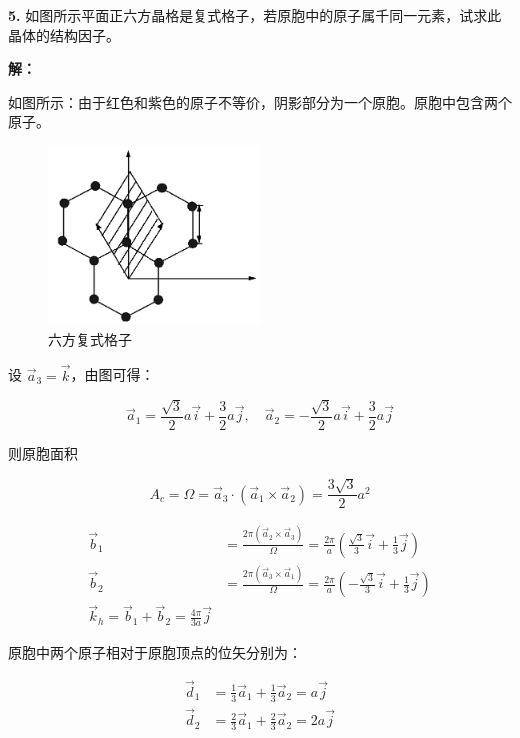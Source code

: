 \noindent \textbf{5.\quad} 如图所示平面正六方晶格是复式格子，若原胞中的原子属千同一元素，试求此晶体的结构因子。

\noindent \textbf{解：}

如图所示：由于红色和紫色的原子不等价，阴影部分为一个原胞。原胞中包含两个原子。

\begin{figure}[htbp]
    \centering
    \includegraphics[width=0.5\textwidth]{pic/六方复式格子.png}
    \caption{六方复式格子}
    \label{fig:7.1}
\end{figure}

设 $\vec{a}_3=\vec{k}$，由图可得：

\begin{equation*}
    \vec{a}_1 = \frac{\sqrt{3}}{2} a \vec{i} + \frac{3}{2} a \vec{j}, \quad \vec{a}_2 = -\frac{\sqrt{3}}{2} a \vec{i} + \frac{3}{2} a \vec{j}
\end{equation*}

则原胞面积

\begin{equation*}
    A_c = \Omega = \vec{a}_3 \cdot (\vec{a}_1 \times\vec{a}_2) = \frac{3\sqrt{3}}{2} a^2
\end{equation*}

\begin{align*}
    \vec{b}_1 &= \frac{2\pi (\vec{a}_2 \times \vec{a}_3)}{\Omega} = \frac{2\pi}{a} \left(\frac{\sqrt{3}}{3}\vec{i} + \frac{1}{3}\vec{j}\right) \\
    \vec{b}_2 &= \frac{2\pi (\vec{a}_3 \times \vec{a}_1)}{\Omega} = \frac{2\pi}{a} \left(-\frac{\sqrt{3}}{3}\vec{i} + \frac{1}{3}\vec{j}\right) \\
    \vec{k}_h = \vec{b}_1 + \vec{b}_2 = \frac{4\pi}{3a} \vec{j}
\end{align*}

原胞中两个原子相对于原胞顶点的位矢分别为：

\begin{align*}
    \vec{d}_1 &= \frac{1}{3} \vec{a}_1 + \frac{1}{3} \vec{a}_2 = a \vec{j} \\
    \vec{d}_2 &= \frac{2}{3} \vec{a}_1 + \frac{2}{3} \vec{a}_2 = 2a \vec{j}
\end{align*}

